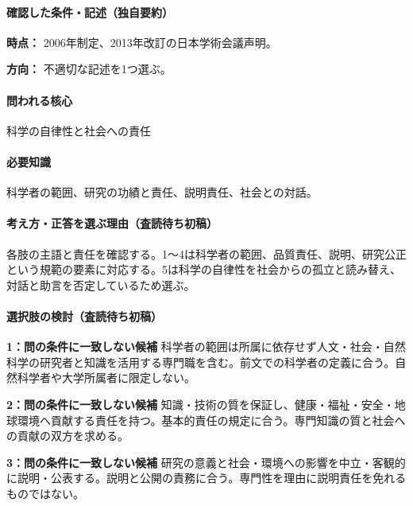 \paragraph{確認した条件・記述（独自要約）}\mbox{}\par

\noindent\textbf{時点：} 2006年制定、2013年改訂の日本学術会議声明。\par

\noindent\textbf{方向：} 不適切な記述を1つ選ぶ。\par

\paragraph{問われる核心} 科学の自律性と社会への責任

\paragraph{必要知識} 科学者の範囲、研究の功績と責任、説明責任、社会との対話。

\paragraph{考え方・正答を選ぶ理由（査読待ち初稿）} 各肢の主語と責任を確認する。1〜4は科学者の範囲、品質責任、説明、研究公正という規範の要素に対応する。5は科学の自律性を社会からの孤立と読み替え、対話と助言を否定しているため選ぶ。

\paragraph{選択肢の検討（査読待ち初稿）}\mbox{}\par

\noindent\textbf{1：問の条件に一致しない候補} 科学者の範囲は所属に依存せず人文・社会・自然科学の研究者と知識を活用する専門職を含む。前文での科学者の定義に合う。自然科学者や大学所属者に限定しない。\par

\noindent\textbf{2：問の条件に一致しない候補} 知識・技術の質を保証し、健康・福祉・安全・地球環境へ貢献する責任を持つ。基本的責任の規定に合う。専門知識の質と社会への貢献の双方を求める。\par

\noindent\textbf{3：問の条件に一致しない候補} 研究の意義と社会・環境への影響を中立・客観的に説明・公表する。説明と公開の責務に合う。専門性を理由に説明責任を免れるものではない。\par

